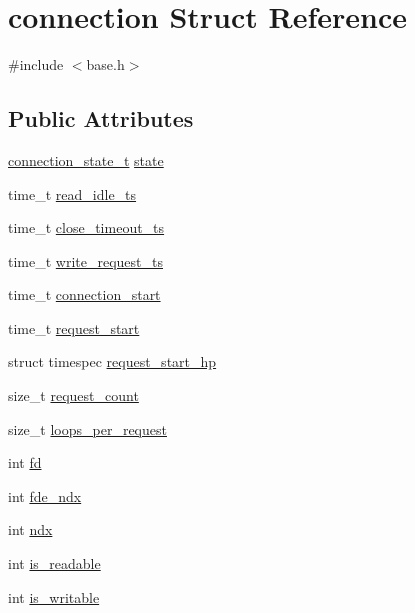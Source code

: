 \hypertarget{structconnection}{\section{connection Struct Reference}
\label{structconnection}
}


{\ttfamily \#include $<$base.\-h$>$}

\subsection*{Public Attributes}
\begin{DoxyCompactItemize}
\item 
\hyperlink{base_8h_a4a3875c10232b606f19a1e9f9d2a698a}{connection\-\_\-state\-\_\-t} \hyperlink{structconnection_aaa1da90a3bf944e556dcf5ad7d69a20d}{state}
\item 
time\-\_\-t \hyperlink{structconnection_a3de703d57f7d66da8493cf8554ed3cb2}{read\-\_\-idle\-\_\-ts}
\item 
time\-\_\-t \hyperlink{structconnection_a991918bf683703616c8a7f6a3a0eacfa}{close\-\_\-timeout\-\_\-ts}
\item 
time\-\_\-t \hyperlink{structconnection_a56f8f4cad319b1d2e3db5ac960cf09c9}{write\-\_\-request\-\_\-ts}
\item 
time\-\_\-t \hyperlink{structconnection_afbe997df45b9c7c51e7db09b52830642}{connection\-\_\-start}
\item 
time\-\_\-t \hyperlink{structconnection_a35ab49ce195e54eb674b504a5b82aa72}{request\-\_\-start}
\item 
struct timespec \hyperlink{structconnection_afffa8ceb142ef540be58e430107c1601}{request\-\_\-start\-\_\-hp}
\item 
size\-\_\-t \hyperlink{structconnection_a7607ed0216aca45cbc4d20b83b2b5102}{request\-\_\-count}
\item 
size\-\_\-t \hyperlink{structconnection_af0f62059eb64e548372987ea930b80da}{loops\-\_\-per\-\_\-request}
\item 
int \hyperlink{structconnection_aa9a96cc6c66ef5a617f51247b2809a40}{fd}
\item 
int \hyperlink{structconnection_a6d5f98c61e568390686dd9ec8f743c76}{fde\-\_\-ndx}
\item 
int \hyperlink{structconnection_aadeba61ce7467142b9a766e9bfb7defa}{ndx}
\item 
int \hyperlink{structconnection_a4356ba50972fa86e3b1852bee2486192}{is\-\_\-readable}
\item 
int \hyperlink{structconnection_af60569b593cb548343b58ff650d57486}{is\-\_\-writable}

\end{DoxyCompactItemize}
